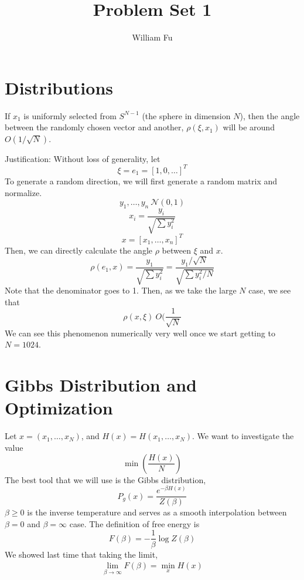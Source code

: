 \documentclass[11pt]{article}
\author{William Fu}
\title{Problem Set 1}
\begin{document}
\section{Distributions}
\begin{example}
If $x_1$ is uniformly selected from $S^{N-1}$ (the sphere in dimension $N$), then the angle between the randomly chosen vector and another, $\rho(\xi, x_1)$ will be around $O(1/\sqrt{N})$. 
\end{example}
Justification: Without loss of generality, let
\[ \xi = e_1 = [1, 0, \dots]^T\]
To generate a random direction, we will first generate a random matrix and normalize.
\[ y_1, \dots, y_n ~ \mathcal{N}(0, 1)\]
\[ x_i = \frac{y_i}{\sqrt{\sum y_i^2}}\]
\[ x = [x_1, \dots, x_n]^T\]
Then, we can directly calculate the angle $\rho$ between $\xi$ and $x$.
\[ \rho(e_1, x) = \frac{y_1}{\sqrt{\sum y_i^2}} = \frac{y_1/\sqrt{N}}{\sqrt{\sum y_i^2/N}}\]
Note that the denominator goes to 1. Then, as we take the large $N$ case, we see that
\[ \rho(x, \xi) ~ O(\frac{1}{\sqrt{N}}\]
We can see this phenomenon numerically very well once we start getting to $N=1024$.

\section{Gibbs Distribution and Optimization}

Let $x = (x_1, \dots, x_N)$, and $H(x) = H(x_1, \dots, x_N)$. We want to investigate the value
\[ \min\left( \frac{H(x)}{N} \right)\]
The best tool that we will use is the Gibbs distribution,
\[ P_g(x) = \frac{e^{-\beta H(x)}}{ Z(\beta)}\]
$\beta \ge 0$ is the inverse temperature and serves as a smooth interpolation between $\beta=0$ and $\beta = \infty$ case. The definition of free energy is
\begin{equation*}
	F(\beta) = -\frac{1}{\beta}\log Z(\beta)
\end{equation*}
We showed last time that taking the limit,
\begin{align*}
	\lim_{\beta \to \infty} F(\beta) = \min_x H(x)
\end{align*}
\end{document}
